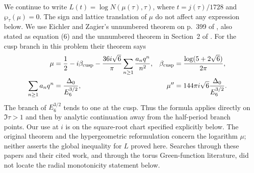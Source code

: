 We continue to write $L(t)=\log N(\mu(\tau),\tau)$, where
$t=j(\tau)/1728$ and $\wp_\tau(\mu)=0$. The sign and lattice
translation of $\mu$ do not affect any expression below. We use
Eichler and Zagier's unnumbered theorem on p.~399 of
\cite{EichlerZagier1982}, also stated as equation (6) and the
unnumbered theorem in Section~2 of \cite{DukeImamoglu2008}.
For the cusp branch in this problem their theorem says
\begin{equation}\label{ari:eq:cc-EZ}
 \begin{aligned}
 \mu&=\frac12-i\beta_{\rm cusp}-
       \frac{36i\sqrt6}{\pi}\sum_{n\ge1}\frac{a_nq^n}{n^2},
 &\beta_{\rm cusp}&=\frac{\log(5+2\sqrt6)}{2\pi},\\
 \sum_{n\ge1}a_nq^n&=\frac{\Delta_0}{E_6^{3/2}},
 &\mu''&=144\pi i\sqrt6\frac{\Delta_0}{E_6^{3/2}}.
 \end{aligned}
\end{equation}
The branch of $E_6^{3/2}$ tends to one at the cusp. Thus the
formula applies directly on $\Im\tau>1$ and then by analytic
continuation away from the half-period branch points. Our use at $i$ is on the square-root chart specified explicitly below.
The original theorem and the hypergeometric reformulation concern
the logarithm $\mu$; neither asserts the global inequality for
$L$ proved here. Searches through these papers and their cited
work, and through the torus Green-function literature, did not
locate the radial monotonicity statement below.

